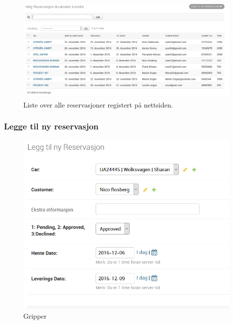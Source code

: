  \begin{figure}[htbp]
	\centering
		\includegraphics[width=16cm, keepaspectratio]{Bilder/admin_liste2.png}
	\caption[Administrasjonsside - Oversikt over reservasjoner]{Liste over alle reservasjoner registert på nettsiden. } %
	\label{fig:admin_list}
\end{figure}





\subsubsection*{Legge til ny reservasjon}




\begin{figure}[h!]
\begin{flushright}
\begin{minipage}{0.4\textwidth}
\begin{center}
    \includegraphics[width=1.2\textwidth]{Bilder/admin_ny_reservasjon.png}
    \caption{Gripper}
    \label{fig:admin_new_res}
\end{center}
\end{minipage}
\end{flushright}
\end{figure}


